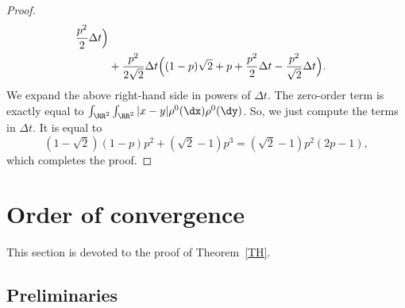 \begin{proof}
\begin{multline*}
\begin{aligned}
\frac{p^2}{2} \Delta t
\Bigr)
\\
& +
\frac{p^2}{2 \sqrt{2}} \Delta t
\Bigl((1-p) \sqrt{2} + p + \frac{p^2}{2} \Delta t - \frac{p^2}{\sqrt{2}} \Delta t
\Bigr).
\end{aligned}
\end{multline*}
We expand the above right-hand side in powers of $\Delta t$. The zero-order term is exactly equal to $\int_{\RR^2} \int_{\RR^2} \vert x-y \vert \rho^0(\dx) \rho^0(\dy)$. So, we just compute the terms in $\Delta t$. It is equal to
\begin{equation*}
(1- \sqrt{2}) (1-p) p^2 + (\sqrt{2}-1)p^3 = (\sqrt{2}-1) p^2 (2p-1),
\end{equation*}
which completes the proof.
\end{proof}



\section{Order of convergence}\label{sec:ordre}

This section is devoted to the proof of Theorem~\ref{TH}.

\subsection{Preliminaries}

